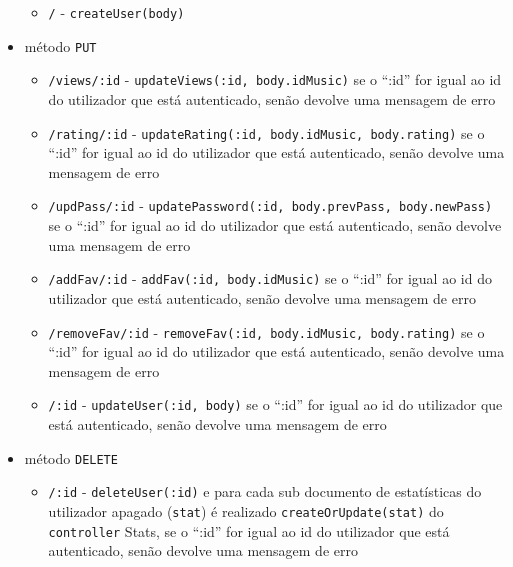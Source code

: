\documentclass{article}
\begin{document}
\begin{itemize}
\begin{itemize}
                \item \texttt{/} - \texttt{createUser(body)}
            \end{itemize}
        \item método \texttt{PUT}
            \begin{itemize}
                \item \texttt{/views/:id} - \texttt{updateViews(:id, body.idMusic)} se o ``:id'' for igual ao id do utilizador que está autenticado, senão devolve uma mensagem de erro
                \item \texttt{/rating/:id} - \texttt{updateRating(:id, body.idMusic, body.rating)} se o ``:id'' for igual ao id do utilizador que está autenticado, senão devolve uma mensagem de erro
                \item \texttt{/updPass/:id} - \texttt{updatePassword(:id, body.prevPass, body.newPass)} se o ``:id'' for igual ao id do utilizador que está autenticado, senão devolve uma mensagem de erro
                \item \texttt{/addFav/:id} - \texttt{addFav(:id, body.idMusic)} se o ``:id'' for igual ao id do utilizador que está autenticado, senão devolve uma mensagem de erro
                \item \texttt{/removeFav/:id} - \texttt{removeFav(:id, body.idMusic, body.rating)} se o ``:id'' for igual ao id do utilizador que está autenticado, senão devolve uma mensagem de erro
                \item \texttt{/:id} - \texttt{updateUser(:id, body)} se o ``:id'' for igual ao id do utilizador que está autenticado, senão devolve uma mensagem de erro
            \end{itemize}
        \item método \texttt{DELETE}
            \begin{itemize}
                \item \texttt{/:id} - \texttt{deleteUser(:id)} e para cada sub documento de estatísticas do utilizador apagado (\texttt{stat}) é realizado \texttt{createOrUpdate(stat)} do \texttt{controller} Stats, se o ``:id'' for igual ao id do utilizador que está autenticado, senão devolve uma mensagem de erro
            \end{itemize}
    \end{itemize}
\end{document}
